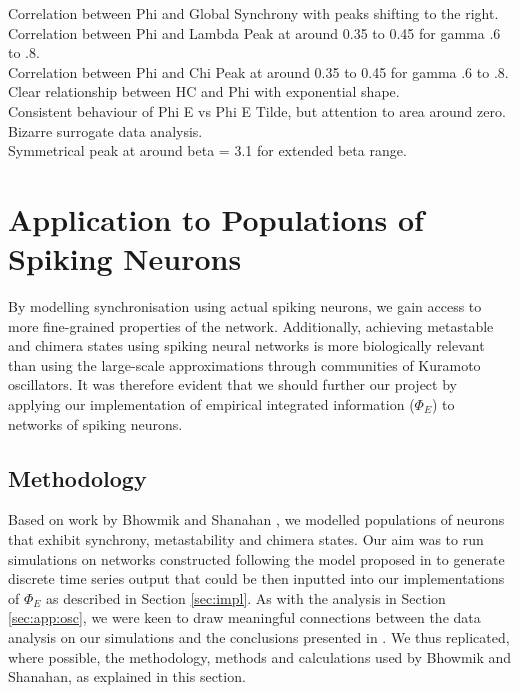 \documentclass[a4paper,11pt]{article}
\begin{document}
Correlation between Phi and Global Synchrony with peaks shifting to the right.\\
Correlation between Phi and Lambda Peak at around 0.35 to 0.45 for gamma .6 to .8.\\
Correlation between Phi and Chi Peak at around 0.35 to 0.45 for gamma .6 to .8.\\
Clear relationship between HC and Phi with exponential shape.\\
Consistent behaviour of Phi E vs Phi E Tilde, but attention to area around zero.\\
Bizarre surrogate data analysis.\\
Symmetrical peak at around beta = 3.1 for extended beta range.

\clearpage

\section{Application to Populations of Spiking Neurons}
\label{MSUSNN}
By modelling synchronisation using actual spiking neurons, we gain access to more fine-grained properties of the network. Additionally, achieving metastable and chimera states using spiking neural networks is more biologically relevant than using the large-scale approximations through communities of Kuramoto oscillators. It was therefore evident that we should further our project by applying our implementation of empirical integrated information ($\Phi_E$) to networks of spiking neurons.

\subsection{Methodology}
\label{sec:snn:methods}

Based on work by Bhowmik and Shanahan \cite{Bhowmik2013}, we modelled populations of neurons that exhibit synchrony, metastability and chimera states. Our aim was to run simulations on networks constructed following the model proposed in \cite{Bhowmik2013} to generate discrete time series output that could be then inputted into our implementations of $\Phi_E$ as described in Section \ref{sec:impl}. As with the analysis in Section \ref{sec:app:osc}, we were keen to draw meaningful connections between the data analysis on our simulations and the conclusions presented in \cite{Bhowmik2013}. We thus replicated, where possible, the methodology, methods and calculations used by Bhowmik and Shanahan, as explained in this section.
\end{document}
